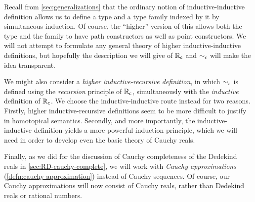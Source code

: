 Recall from \cref{sec:generalizations} that the ordinary notion of inductive-inductive definition allows us to define a type and a type family indexed by it by simultaneous induction.
Of course, the ``higher'' version of this allows both the type and the family to have path constructors as well as point constructors.
We will not attempt to formulate any general theory of higher inductive-inductive definitions, but hopefully the description we will give of $\mathbb{R}_\mathsf{c}$ and $\sim_{\epsilon}$ will make the idea transparent.

\begin{rmk}
  We might also consider a \emph{higher inductive-recursive definition}, in which $\sim_{\epsilon}$ is defined using the \emph{recursion} principle of $\mathbb{R}_\mathsf{c}$, simultaneously with the \emph{inductive} definition of $\mathbb{R}_\mathsf{c}$.
  We choose the inductive-inductive route instead for two reasons.
  Firstly, higher inductive-re\-cur\-sive definitions seem to be more difficult to justify in homotopical semantics.
  Secondly, and more importantly, the inductive-inductive definition yields a more powerful induction principle, which we will need in order to develop even the basic theory of Cauchy reals.
\end{rmk}

Finally, as we did for the discussion of Cauchy completeness of the Dedekind reals in \cref{sec:RD-cauchy-complete}, we will work with \emph{Cauchy approximations} (\cref{defn:cauchy-approximation}) instead of Cauchy sequences.
Of course, our Cauchy approximations will now consist of Cauchy reals, rather than Dedekind reals or rational numbers.

